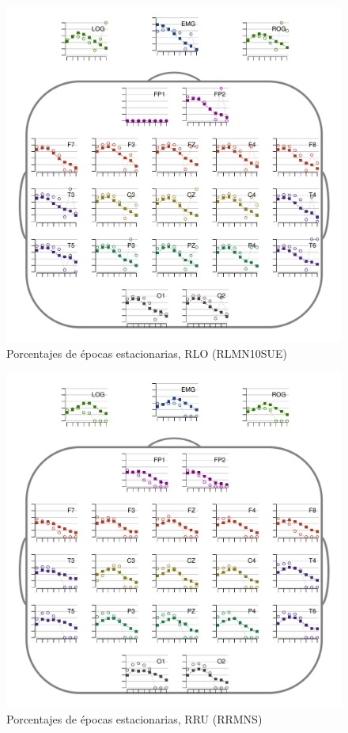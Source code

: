 \begin{figure}
\centering
\includegraphics[width=.9\linewidth]{./img_resultados/RLMN10SUE_cabeza_epocas_.pdf}
\caption{Porcentajes de épocas estacionarias, RLO (RLMN10SUE)}
\end{figure}

\begin{figure}
\centering
\includegraphics[width=.9\linewidth]{./img_resultados/RRMNS_cabeza_epocas_.pdf}
\caption{Porcentajes de épocas estacionarias, RRU (RRMNS)}
\end{figure}

